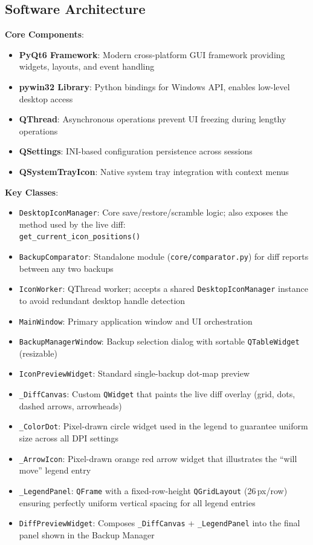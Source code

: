 \documentclass[a4paper,11pt]{article}
\begin{document}
\subsection{Software Architecture}

\textbf{Core Components}:

\begin{itemize}
  \item \textbf{PyQt6 Framework}: Modern cross-platform GUI framework
    providing widgets, layouts, and event handling
  \item \textbf{pywin32 Library}: Python bindings for Windows API,
    enables low-level desktop access
  \item \textbf{QThread}: Asynchronous operations prevent UI freezing
    during lengthy operations
  \item \textbf{QSettings}: INI-based configuration persistence across sessions
  \item \textbf{QSystemTrayIcon}: Native system tray integration with
    context menus
\end{itemize}

\textbf{Key Classes}:

\begin{itemize}
  \item \texttt{DesktopIconManager}: Core save/restore/scramble
    logic; also exposes the method used by the live diff:\\
    \texttt{get\_current\_icon\_positions()}
  \item \texttt{BackupComparator}: Standalone module
    (\texttt{core/comparator.py}) for diff reports between
    any two backups
  \item \texttt{IconWorker}: QThread worker; accepts a shared
    \texttt{DesktopIconManager} instance to avoid redundant
    desktop handle detection
  \item \texttt{MainWindow}: Primary application window and
    UI orchestration
  \item \texttt{BackupManagerWindow}: Backup selection dialog
    with sortable \texttt{QTableWidget} (resizable)
  \item \texttt{IconPreviewWidget}: Standard single-backup
    dot-map preview
  \item \texttt{\_DiffCanvas}: Custom \texttt{QWidget} that
    paints the live diff overlay (grid, dots, dashed arrows,
    arrowheads)
  \item \texttt{\_ColorDot}: Pixel-drawn circle widget used in
    the legend to guarantee uniform size across all DPI settings
  \item \texttt{\_ArrowIcon}: Pixel-drawn
    orange\,\textrightarrow\,red arrow widget that illustrates
    the ``will move'' legend entry
  \item \texttt{\_LegendPanel}: \texttt{QFrame} with a
    fixed-row-height \texttt{QGridLayout} (26\,px/row) ensuring
    perfectly uniform vertical spacing for all legend entries
  \item \texttt{DiffPreviewWidget}: Composes
    \texttt{\_DiffCanvas} + \texttt{\_LegendPanel} into the
    final panel shown in the Backup Manager
\end{itemize}
\end{document}
